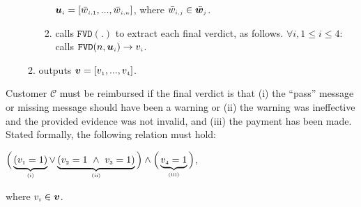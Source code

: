 \begin{enumerate}
\begin{enumerate}
\begin{enumerate}
  $\bm u_{\scriptscriptstyle i}=[\bar{w}_{\scriptscriptstyle i,1},...,\bar{w}_{\scriptscriptstyle i,n}]$, where $\bar{w}_{\scriptscriptstyle i,j}\in \bar {\bm w}_{\scriptscriptstyle j}$. 
%
\item calls $\mathtt{FVD}(.)$ to extract each final verdict, as follows. $\forall i, 1\leq i \leq 4:$ calls $\mathtt{FVD}(n,  {\bm u}_{\scriptscriptstyle i})\rightarrow  v_{\scriptscriptstyle i}$. 




%
%
%
%
\end{enumerate}
%

\item outputs $\bm v=[v_{\scriptscriptstyle 1},...,v_{\scriptscriptstyle 4}]$.

\end{enumerate}
\end{enumerate}
Customer $\mathcal{C}$ must be reimbursed if the final verdict is that (i)  the ``pass'' message or  missing message should have been a warning or (ii)  the warning was ineffective and the provided evidence was not invalid, and (iii) the payment has been made. Stated formally, the following relation must hold: 
%
\begin{center}
$\Big( \underbrace{(v_{\scriptscriptstyle 1}=1)}_{\scriptscriptstyle (\text{i})}\vee  \underbrace{(v_{\scriptscriptstyle 2}=1\ \wedge\ v_{\scriptscriptstyle 3}=1)}_{\scriptscriptstyle (\text {ii})}\Big)\wedge\Big(\underbrace{v_{\scriptscriptstyle 4}=1}_{\scriptscriptstyle (\text{iii})}\Big)$,
\end{center}
%
 where $v_{\scriptscriptstyle i}\in \bm v$.
%
